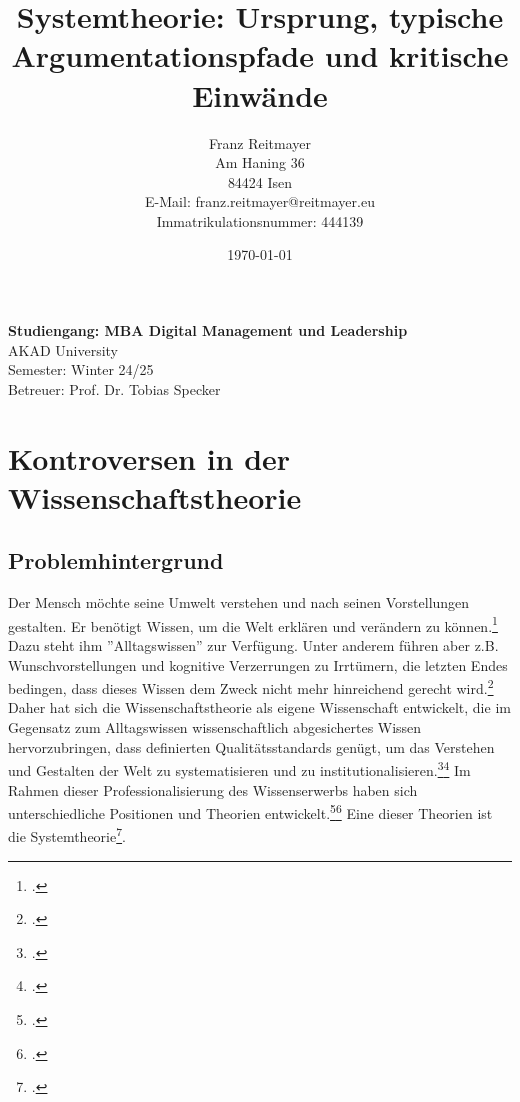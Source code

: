 \documentclass[a4paper,12pt]{article}
\title{Systemtheorie: Ursprung, typische Argumentationspfade und kritische Einwände}
\date{\today}
\begin{document}
\author{
    Franz Reitmayer \\
    Am Haning 36 \\
    84424 Isen \\
    E-Mail: franz.reitmayer@reitmayer.eu \\ 
    Immatrikulationsnummer: 444139
}

\maketitle
\vfill
\begin{center}
\textbf{Studiengang: MBA Digital Management und Leadership} \\
AKAD University \\
Semester: Winter 24/25 \\
Betreuer: Prof. Dr. Tobias Specker \\

\end{center}
\vfill
\newpage
\tableofcontents
\newpage



\section{Kontroversen in der Wissenschaftstheorie}
\subsection{Problemhintergrund}
Der Mensch möchte seine Umwelt verstehen und nach seinen Vorstellungen gestalten. Er benötigt Wissen, um die Welt erklären und verändern zu können.\footcite[S. 1]{Helfrich2024} Dazu steht ihm ''Alltagswissen'' zur Verfügung. Unter anderem führen aber z.B. Wunschvorstellungen und kognitive Verzerrungen zu Irrtümern, die letzten Endes bedingen, dass dieses Wissen dem Zweck nicht mehr hinreichend gerecht wird.\footcite[S. 9]{Helfrich2024} Daher hat sich die Wissenschaftstheorie als eigene Wissenschaft entwickelt, die im Gegensatz zum Alltagswissen wissenschaftlich abgesichertes Wissen hervorzubringen, dass definierten Qualitätsstandards genügt, um das Verstehen und Gestalten der Welt zu systematisieren und zu institutionalisieren.\footcite[Seite 4]{Kornmeier2007}\footcite[S. 3]{Helfrich2024} Im Rahmen dieser Professionalisierung des Wissenserwerbs haben sich unterschiedliche Positionen und Theorien entwickelt.\footcite[S. 19 ff]{Kornmesser2020}\footcite[S. 93]{Helfrich2024} Eine dieser Theorien ist die Systemtheorie\footcite[S. 107]{Helfrich2024}.
\end{document}
